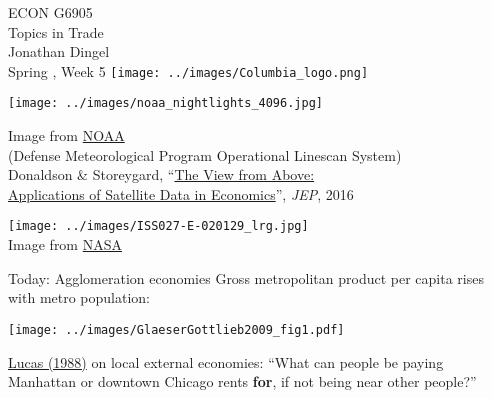 \documentclass[11pt,notes=hide,aspectratio=169]{beamer}
\begin{document}
\begin{frame}[plain]
\begin{center}
\large
\textcolor{columbiadarkblue}{ECON G6905\\
Topics in Trade\\ 
Jonathan Dingel\\
Spring \the\year, Week 5}
\vfill 
\texttt{[image: ../images/Columbia\_logo.png]}
\end{center}
\end{frame}
\begin{frame}[plain]
\begin{center}
\texttt{[image: ../images/noaa\_nightlights\_4096.jpg]} \\
{\small
Image from \href{ftp://public.sos.noaa.gov/land/earth_night/nightlights/4096.jpg}{NOAA} \\
(Defense Meteorological Program Operational Linescan System)\\
Donaldson \& Storeygard, ``\href{https://www.aeaweb.org/articles?id=10.1257/jep.30.4.171}{The View from Above: \\ Applications of Satellite Data in Economics}'', \textit{JEP}, 2016
\par}
\end{center}
\end{frame}
\begin{frame}[plain]
\begin{center}
\texttt{[image: ../images/ISS027-E-020129\_lrg.jpg]} \\
Image from \href{https://visibleearth.nasa.gov/view.php?id=50671
}{NASA}
\end{center}
\end{frame}
\begin{frame}{Today: Agglomeration economies}
Gross metropolitan product per capita rises with metro population:
\begin{center}
\texttt{[image: ../images/GlaeserGottlieb2009\_fig1.pdf]}
\end{center}
\href{https://www.sciencedirect.com/science/article/pii/0304393288901687}{Lucas (1988)} on local external economies:
``What can people be paying Manhattan or downtown Chicago rents \textbf{for}, if not being near other people?''
\end{frame}
\end{document}
